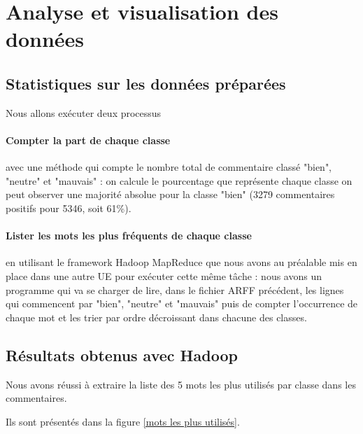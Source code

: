\documentclass[a4paper, 11pt]{article}
\begin{document}
\section{Analyse et visualisation des données}
 

 
\subsection{Statistiques sur les données préparées}\label{sec:visu-process}
 
Nous allons exécuter deux processus
\paragraph{Compter la part de chaque classe} avec une méthode qui compte le nombre total de commentaire classé "bien", "neutre" et "mauvais" : on calcule le pourcentage que représente chaque classe on peut observer une majorité absolue pour la classe "bien" (3279 commentaires positifs pour 5346, soit 61\%).
 
\paragraph{Lister les mots les plus fréquents de chaque classe} en utilisant le framework Hadoop MapReduce que nous avons au préalable mis en place dans une autre UE pour exécuter cette même tâche : nous avons un programme qui va se charger de lire, dans le fichier ARFF précédent, les lignes qui commencent par "bien", "neutre" et "mauvais" puis de compter l'occurrence de chaque mot et les trier par ordre décroissant dans chacune des classes.
 
\subsection{Résultats obtenus avec Hadoop}
Nous avons réussi à extraire la liste des 5 mots les plus utilisés par classe dans les commentaires.

Ils sont présentés dans la figure \ref{mots les plus utilisés}.
\end{document}
